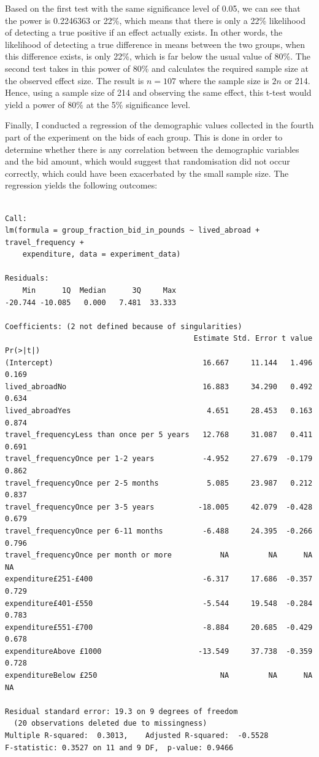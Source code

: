 \documentclass[
]{report}
\begin{document}
Based on the first test with the same significance level of 0.05, we can
see that the power is 0.2246363 or 22\%, which means that there is only
a 22\% likelihood of detecting a true positive if an effect actually
exists. In other words, the likelihood of detecting a true difference in
means between the two groups, when this difference exists, is only 22\%,
which is far below the usual value of 80\%. The second test takes in
this power of 80\% and calculates the required sample size at the
observed effect size. The result is \(n = 107\) where the sample size is
\(2n\) or 214. Hence, using a sample size of 214 and observing the same
effect, this t-test would yield a power of 80\% at the 5\% significance
level.

Finally, I conducted a regression of the demographic values collected in
the fourth part of the experiment on the bids of each group. This is
done in order to determine whether there is any correlation between the
demographic variables and the bid amount, which would suggest that
randomisation did not occur correctly, which could have been exacerbated
by the small sample size. The regression yields the following outcomes:

\begin{verbatim}

Call:
lm(formula = group_fraction_bid_in_pounds ~ lived_abroad + travel_frequency + 
    expenditure, data = experiment_data)

Residuals:
    Min      1Q  Median      3Q     Max 
-20.744 -10.085   0.000   7.481  33.333 

Coefficients: (2 not defined because of singularities)
                                           Estimate Std. Error t value Pr(>|t|)
(Intercept)                                  16.667     11.144   1.496    0.169
lived_abroadNo                               16.883     34.290   0.492    0.634
lived_abroadYes                               4.651     28.453   0.163    0.874
travel_frequencyLess than once per 5 years   12.768     31.087   0.411    0.691
travel_frequencyOnce per 1-2 years           -4.952     27.679  -0.179    0.862
travel_frequencyOnce per 2-5 months           5.085     23.987   0.212    0.837
travel_frequencyOnce per 3-5 years          -18.005     42.079  -0.428    0.679
travel_frequencyOnce per 6-11 months         -6.488     24.395  -0.266    0.796
travel_frequencyOnce per month or more           NA         NA      NA       NA
expenditure£251-£400                         -6.317     17.686  -0.357    0.729
expenditure£401-£550                         -5.544     19.548  -0.284    0.783
expenditure£551-£700                         -8.884     20.685  -0.429    0.678
expenditureAbove £1000                      -13.549     37.738  -0.359    0.728
expenditureBelow £250                            NA         NA      NA       NA

Residual standard error: 19.3 on 9 degrees of freedom
  (20 observations deleted due to missingness)
Multiple R-squared:  0.3013,    Adjusted R-squared:  -0.5528 
F-statistic: 0.3527 on 11 and 9 DF,  p-value: 0.9466
\end{verbatim}
\end{document}
